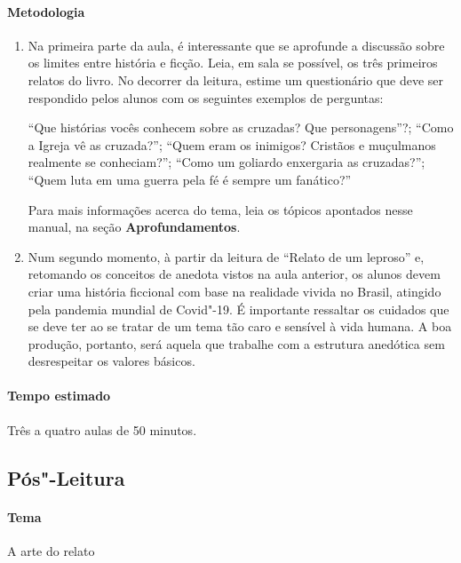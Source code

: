 \documentclass[12pt]{extarticle}
\begin{document}
 \paragraph{Metodologia}
 	\begin{enumerate}
 		\item
 		Na primeira parte da aula, é interessante que se aprofunde a discussão sobre 
 		os limites entre história e ficção. Leia, em sala se possível, os três
 		primeiros relatos do livro. No decorrer da leitura, estime um questionário
 		que deve ser respondido pelos alunos com os seguintes exemplos de perguntas: 

 		``Que histórias vocês conhecem sobre as cruzadas? Que personagens''?; ``Como a Igreja vê as cruzada?'';	``Quem eram os inimigos? Cristãos e muçulmanos realmente se conheciam?''; ``Como um goliardo enxergaria as cruzadas?'';	``Quem luta em uma guerra pela fé é sempre um fanático?'' 

 		Para mais informações acerca do tema, leia os tópicos apontados nesse manual, na seção \textbf{Aprofundamentos}. 
 	
 		\item
 		Num segundo momento, à partir da leitura de ``Relato de um leproso'' e, retomando os 
 		conceitos de anedota vistos na aula anterior,
 		os alunos devem criar uma história ficcional com base na realidade vivida
 		no Brasil, atingido pela pandemia mundial de Covid"-19.
 		É importante ressaltar os cuidados que se deve ter ao se tratar de um tema
 		tão caro e sensível à vida humana. A boa produção, portanto, será aquela que 
 		trabalhe com a estrutura anedótica sem desrespeitar os valores básicos.

 	\end{enumerate}
 \paragraph{Tempo estimado} Três a quatro aulas de 50 minutos.


\subsection{Pós"-Leitura}

 \paragraph{Tema} A arte do relato
\end{document}
